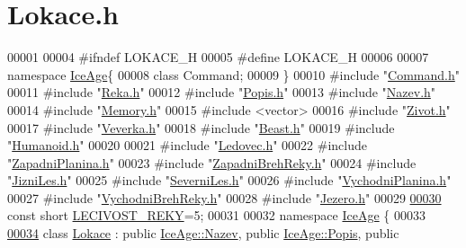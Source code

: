 \hypertarget{Lokace_8h_source}{}\section{Lokace.\+h}
\label{Lokace_8h_source}

\begin{DoxyCode}
00001 
00004 \textcolor{preprocessor}{#ifndef LOKACE\_H}
00005 \textcolor{preprocessor}{#define LOKACE\_H}
00006 
00007 \textcolor{keyword}{namespace }\hyperlink{namespaceIceAge}{IceAge}\{
00008     \textcolor{keyword}{class }Command;
00009 \}
00010 \textcolor{preprocessor}{#include "\hyperlink{Command_8h}{Command.h}"}
00011 \textcolor{preprocessor}{#include "\hyperlink{Reka_8h}{Reka.h}"}
00012 \textcolor{preprocessor}{#include "\hyperlink{Popis_8h}{Popis.h}"}
00013 \textcolor{preprocessor}{#include "\hyperlink{Nazev_8h}{Nazev.h}"}
00014 \textcolor{preprocessor}{#include "\hyperlink{Memory_8h}{Memory.h}"}
00015 \textcolor{preprocessor}{#include <vector>}
00016 \textcolor{preprocessor}{#include "\hyperlink{Zivot_8h}{Zivot.h}"}
00017 \textcolor{preprocessor}{#include "\hyperlink{Veverka_8h}{Veverka.h}"}
00018 \textcolor{preprocessor}{#include "\hyperlink{Beast_8h}{Beast.h}"}
00019 \textcolor{preprocessor}{#include "\hyperlink{Humanoid_8h}{Humanoid.h}"}
00020 
00021 \textcolor{preprocessor}{#include "\hyperlink{Ledovec_8h}{Ledovec.h}"}
00022 \textcolor{preprocessor}{#include "\hyperlink{ZapadniPlanina_8h}{ZapadniPlanina.h}"}
00023 \textcolor{preprocessor}{#include "\hyperlink{ZapadniBrehReky_8h}{ZapadniBrehReky.h}"}
00024 \textcolor{preprocessor}{#include "\hyperlink{JizniLes_8h}{JizniLes.h}"}
00025 \textcolor{preprocessor}{#include "\hyperlink{SeverniLes_8h}{SeverniLes.h}"}
00026 \textcolor{preprocessor}{#include "\hyperlink{VychodniPlanina_8h}{VychodniPlanina.h}"}
00027 \textcolor{preprocessor}{#include "\hyperlink{VychodniBrehReky_8h}{VychodniBrehReky.h}"}
00028 \textcolor{preprocessor}{#include "\hyperlink{Jezero_8h}{Jezero.h}"}
00029 
\hypertarget{Lokace_8h_source.tex_l00030}{}\hyperlink{Lokace_8h_aa01cd748a46ef05160d9b753deb3b8e3}{00030} \textcolor{keyword}{const} \textcolor{keywordtype}{short} \hyperlink{Lokace_8h_aa01cd748a46ef05160d9b753deb3b8e3}{LECIVOST\_REKY}=5;
00031 
00032 \textcolor{keyword}{namespace }\hyperlink{namespaceIceAge}{IceAge} \{
00033 
\hypertarget{Lokace_8h_source.tex_l00034}{}\hyperlink{classIceAge_1_1Lokace}{00034}     \textcolor{keyword}{class }\hyperlink{classIceAge_1_1Lokace}{Lokace} : \textcolor{keyword}{public} \hyperlink{classIceAge_1_1Nazev}{IceAge::Nazev}, \textcolor{keyword}{public} \hyperlink{classIceAge_1_1Popis}{IceAge::Popis}, \textcolor{keyword}{public} 

\end{DoxyCode}
